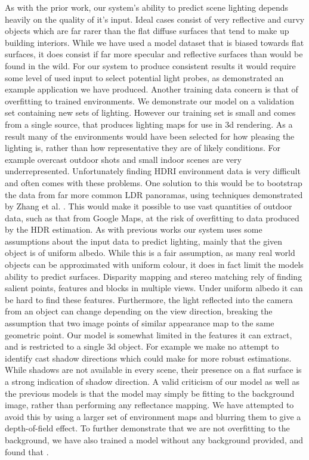 \documentclass[ %
                    author={Gavin Parker},
                supervisor={Dr. Neill Campbell},
                    degree={MEng},
                     title={Deep Siamese Networks for Illumination Estimation from Stereo Images},
                  subtitle={},
                      type={research},
                      year={2018} ]{dissertation}
\begin{document}
As with the prior work, our system's ability to predict scene lighting depends heavily on the quality of it's input. Ideal cases consist of very reflective and curvy objects which are far rarer than the flat diffuse surfaces that tend to make up building interiors. While we have used a model dataset that is biased towards flat surfaces, it does consist if far more specular and reflective surfaces than would be found in the wild. For our system to produce consistent results it would require some level of used input to select potential light probes, as demonstrated an example application we have produced. Another training data concern is that of overfitting to trained environments. We demonstrate our model on a validation set containing new sets of lighting. However our training set is small and comes from a single source, that produces lighting maps for use in 3d rendering. As a result many of the environments would have been selected for how pleasing the lighting is, rather than how representative they are of likely conditions. For example overcast outdoor shots and small indoor scenes are very underrepresented. Unfortunately finding HDRI environment data is very difficult and often comes with these problems. One solution to this would be to bootstrap the data from far more common LDR panoramas, using techniques demonstrated by Zhang et al. \cite{zhang2017learning}. This would make it possible to use vast quantities of outdoor data, such as that from Google Maps, at the risk of overfitting to data produced by the HDR estimation.
\newline
As with previous works our system uses some assumptions about the input data to predict lighting, mainly that the given object is of uniform albedo. While this is a fair assumption, as many real world objects can be approximated with uniform colour, it does in fact limit the models ability to predict surfaces. Disparity mapping and stereo matching rely of finding salient points, features and blocks in multiple views. Under uniform albedo it can be hard to find these features. Furthermore, the light reflected into the camera from an object can change depending on the view direction, breaking the assumption that two image points of similar appearance map to the same geometric point.
\newline
Our model is somewhat limited in the features it can extract, and is restricted to a single 3d object. For example we make no attempt to identify cast shadow directions which could make for more robust estimations. While shadows are not available in every scene, their presence on a flat surface is a strong indication of shadow direction.
\newline
A valid criticism of our model as well as the previous models is that the model may simply be fitting to the background image, rather than performing any reflectance mapping. We have attempted to avoid this by using a larger set of environment maps and blurring them to give a depth-of-field effect. To further demonstrate that we are not overfitting to the background, we have also trained a model without any background provided, and found that .
\end{document}
